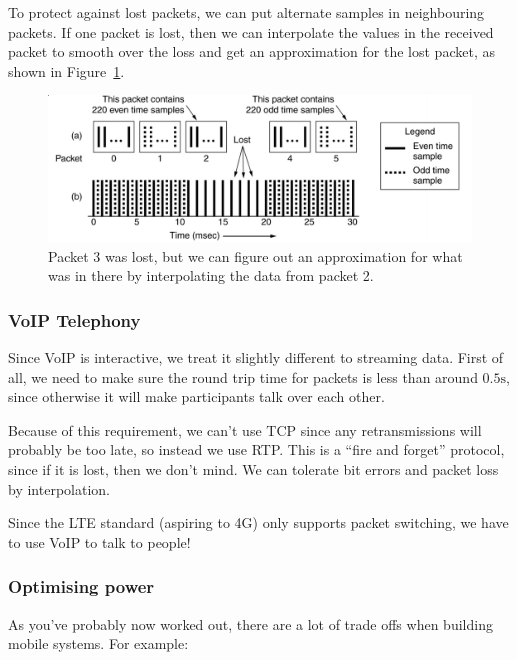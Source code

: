 To protect against lost packets, we can put alternate samples in neighbouring
packets. If one packet is lost, then we can interpolate the values in the
received packet to smooth over the loss and get an approximation for the lost
packet, as shown in Figure~\ref{interpolate}.

\begin{figure}[ht]
  \includegraphics[width=\textwidth]{images/interpolate}
  \caption{Packet 3 was lost, but we can figure out an approximation for what
  was in there by interpolating the data from packet 2.}
  \label{interpolate}
\end{figure}

\subsubsection{VoIP Telephony}

Since VoIP is interactive, we treat it slightly different to streaming data.
First of all, we need to make sure the round trip time for packets is less than
around $0.5\si{\second}$, since otherwise it will make participants talk over
each other.

Because of this requirement, we can't use TCP since any retransmissions will
probably be too late, so instead we use RTP. This is a ``fire and forget''
protocol, since if it is lost, then we don't mind. We can tolerate bit errors
and packet loss by interpolation.

Since the LTE standard (aspiring to 4G) only supports packet switching, we have
to use VoIP to talk to people! 

\subsubsection{Optimising power}

As you've probably now worked out, there are a lot of trade offs when building
mobile systems. For example:

